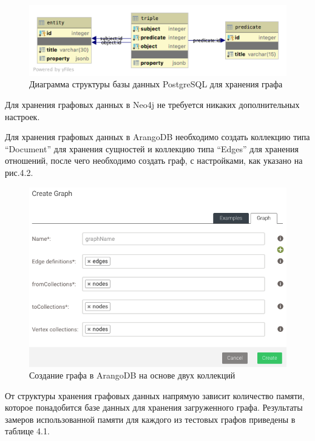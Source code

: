 \begin{figure}[ht!]
    \center
    \includegraphics [scale=0.35] {my_folder/myimg//8}
    \caption{Диаграмма структуры базы данных PostgreSQL для хранения графа}
\end{figure}

Для хранения графовых данных в Neo4j не требуется никаких дополнительных настроек.

Для хранения графовых данных в ArangoDB необходимо создать коллекцию типа “Document” для хранения сущностей и коллекцию типа “Edges” для хранения отношений, после чего необходимо создать граф, с настройками, как указано на рис.4.2.

\begin{figure}[ht!]
    \center
    \includegraphics [scale=0.5] {my_folder/myimg//9}
    \caption{Создание графа в ArangoDB на основе двух коллекций}
\end{figure}

От структуры хранения графовых данных напрямую зависит количество памяти, которое понадобится базе данных для хранения загруженного графа. Результаты замеров использованной памяти для каждого из тестовых графов приведены в таблице 4.1.

